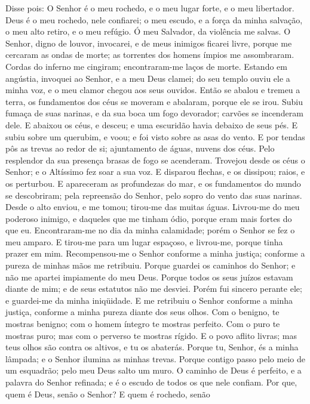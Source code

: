 Disse pois: O Senhor é o meu rochedo, e o meu lugar forte, e o meu
libertador. Deus é o meu rochedo, nele confiarei; o meu escudo,
e a força da minha salvação, o meu alto retiro, e o meu refúgio. Ó
meu Salvador, da violência me salvas. O Senhor, digno de louvor,
invocarei, e de meus inimigos ficarei livre, porque me cercaram
as ondas de morte; as torrentes dos homens ímpios me assombraram.
Cordas do inferno me cingiram; encontraram-me laços de morte.
Estando em angústia, invoquei ao Senhor, e a meu Deus clamei; do
seu templo ouviu ele a minha voz, e o meu clamor chegou aos seus
ouvidos. Então se abalou e tremeu a terra, os fundamentos dos
céus se moveram e abalaram, porque ele se irou. Subiu fumaça de
suas narinas, e da sua boca um fogo devorador; carvões se incenderam
dele. E abaixou os céus, e desceu; e uma escuridão havia
debaixo de seus pés. E subiu sobre um querubim, e voou; e foi
visto sobre as asas do vento. E por tendas pôs as trevas ao
redor de si; ajuntamento de águas, nuvens dos céus. Pelo
resplendor da sua presença brasas de fogo se acenderam.
Trovejou desde os céus o Senhor; e o Altíssimo fez soar a sua
voz. E disparou flechas, e os dissipou; raios, e os
perturbou. E apareceram as profundezas do mar, e os
fundamentos do mundo se descobriram; pela repreensão do Senhor, pelo
sopro do vento das suas narinas. Desde o alto enviou, e me
tomou; tirou-me das muitas águas. Livrou-me do meu poderoso
inimigo, e daqueles que me tinham ódio, porque eram mais fortes do
que eu. Encontraram-me no dia da minha calamidade; porém o
Senhor se fez o meu amparo. E tirou-me para um lugar
espaçoso, e livrou-me, porque tinha prazer em mim.
Recompensou-me o Senhor conforme a minha justiça; conforme a
pureza de minhas mãos me retribuiu. Porque guardei os
caminhos do Senhor; e não me apartei impiamente do meu Deus.
Porque todos os seus juízos estavam diante de mim; e de seus
estatutos não me desviei. Porém fui sincero perante ele; e
guardei-me da minha iniqüidade. E me retribuiu o Senhor
conforme a minha justiça, conforme a minha pureza diante dos seus
olhos. Com o benigno, te mostras benigno; com o homem íntegro
te mostras perfeito. Com o puro te mostras puro; mas com o
perverso te mostras rígido. E o povo aflito livras; mas teus
olhos são contra os altivos, e tu os abaterás. Porque tu,
Senhor, és a minha lâmpada; e o Senhor ilumina as minhas trevas.
Porque contigo passo pelo meio de um esquadrão; pelo meu Deus
salto um muro. O caminho de Deus é perfeito, e a palavra do
Senhor refinada; e é o escudo de todos os que nele confiam.
Por que, quem é Deus, senão o Senhor? E quem é rochedo, senão
